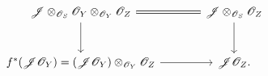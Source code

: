 \[
\begin{tikzcd}[column sep=large,row sep=large]
  \mathscr J\otimes_{\mathscr O_S}\mathscr O_Y
    \otimes_{\mathscr O_Y}\mathscr O_Z
    \arrow[r,equal]
    \arrow[d]
  &
  \mathscr J\otimes_{\mathscr O_S}\mathscr O_Z
    \arrow[d]
  \\
  f^*(\mathscr J\mathscr O_Y)
    =(\mathscr J\mathscr O_Y)\otimes_{\mathscr O_Y}\mathscr O_Z
    \arrow[r]
  &
  \mathscr J\mathscr O_Z.
\end{tikzcd}
\]

